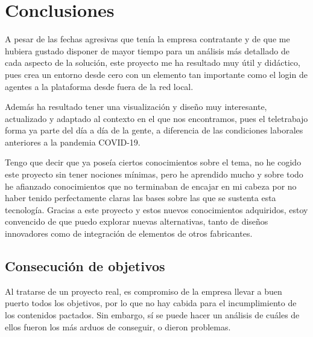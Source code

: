 \documentclass[a4paper, 12pt]{book}
\begin{document}

\cleardoublepage
\chapter{Conclusiones}
\label{chap:conclusiones}

A pesar de las fechas agresivas que tenía la empresa contratante y de que me hubiera gustado disponer de mayor tiempo para un análisis más detallado de cada aspecto de la solución, este proyecto me ha resultado muy útil y didáctico, pues crea un entorno desde cero con un elemento tan importante como el login de agentes a la plataforma desde fuera de la red local. 

Además ha resultado tener una visualización y diseño muy interesante, actualizado y adaptado al contexto en el que nos encontramos, pues el teletrabajo forma ya parte del día a día de la gente, a diferencia de las condiciones laborales anteriores a la pandemia COVID-19.

Tengo que decir que ya poseía ciertos conocimientos sobre el tema, no he cogido este proyecto sin tener nociones mínimas, pero he aprendido mucho y sobre todo he afianzado conocimientos que no terminaban de encajar en mi cabeza por no haber tenido perfectamente claras las bases sobre las que se sustenta esta tecnología. Gracias a este proyecto y estos nuevos conocimientos adquiridos, estoy convencido de que puedo explorar nuevas alternativas, tanto de diseños innovadores como de integración de elementos de otros fabricantes.

\section{Consecución de objetivos}
\label{sec:consecucion-objetivos}

Al tratarse de un proyecto real, es compromiso de la empresa llevar a buen puerto todos los objetivos, por lo que no hay cabida para el incumplimiento de los contenidos pactados. Sin embargo, sí se puede hacer un análisis de cuáles de ellos fueron los más arduos de conseguir, o dieron problemas.
\end{document}
